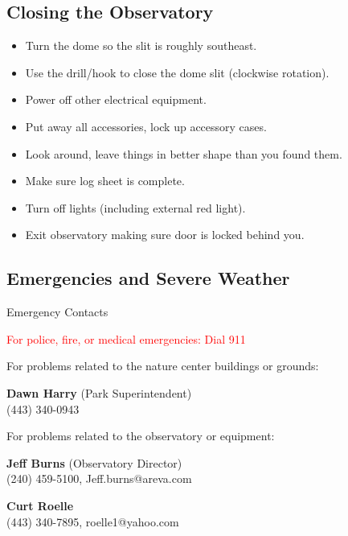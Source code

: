 \subsection{Closing the Observatory}
\begin{frame}{\insertsubsectionhead}
  \Large
  \begin{itemize}
    \item Turn the dome so the slit is roughly southeast.
    \item Use the drill/hook to close the dome slit (clockwise rotation).
    \item Power off other electrical equipment.
    \item Put away all accessories, lock up accessory cases.
    \item Look around, leave things in better shape than you found them.
    \item Make sure log sheet is complete.
    \item Turn off lights (including external red light).
    \item Exit observatory making sure door is locked behind you.
  \end{itemize}
 \end{frame}

\subsection{Emergencies and Severe Weather}
\begin{frame}[t]{Emergency Contacts}
  
  {\LARGE\centering
  \textcolor{red}{For police, fire, or medical emergencies: Dial 911}}

  For problems related to the nature center buildings or grounds:

  \textbf{Dawn Harry} (Park Superintendent)\\
  (443) 340-0943

  For problems related to the observatory or equipment:

  \textbf{Jeff Burns} (Observatory Director)\\
  (240) 459-5100, Jeff.burns@areva.com

  \textbf{Curt Roelle}\\
  (443) 340-7895, roelle1@yahoo.com 
\end{frame}



